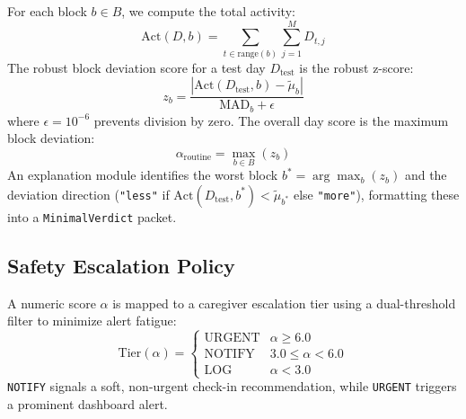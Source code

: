 \documentclass[conference]{IEEEtran}
\begin{document}
For each block $b \in B$, we compute the total activity:
\begin{equation}
\text{Act}(D, b) = \sum_{t \in \text{range}(b)} \sum_{j=1}^{M} D_{t, j}
\end{equation}
The robust block deviation score for a test day $D_{\text{test}}$ is the robust z-score:
\begin{equation}
z_b = \frac{|\text{Act}(D_{\text{test}}, b) - \tilde{\mu}_b|}{\text{MAD}_b + \epsilon}
\end{equation}
where $\epsilon = 10^{-6}$ prevents division by zero. The overall day score is the maximum block deviation:
\begin{equation}
\alpha_{\text{routine}} = \max_{b \in B} (z_b)
\end{equation}
An explanation module identifies the worst block $b^* = \arg\max_{b} (z_b)$ and the deviation direction (\texttt{"less"} if $\text{Act}(D_{\text{test}}, b^*) < \tilde{\mu}_{b^*}$ else \texttt{"more"}), formatting these into a \texttt{MinimalVerdict} packet.

\subsection{Safety Escalation Policy}
A numeric score $\alpha$ is mapped to a caregiver escalation tier using a dual-threshold filter to minimize alert fatigue:
\begin{equation}
\text{Tier}(\alpha) = \begin{cases} 
      \text{URGENT} & \alpha \ge 6.0 \\
      \text{NOTIFY} & 3.0 \le \alpha < 6.0 \\
      \text{LOG} & \alpha < 3.0 
   \end{cases}
\end{equation}
\texttt{NOTIFY} signals a soft, non-urgent check-in recommendation, while \texttt{URGENT} triggers a prominent dashboard alert.
\end{document}
